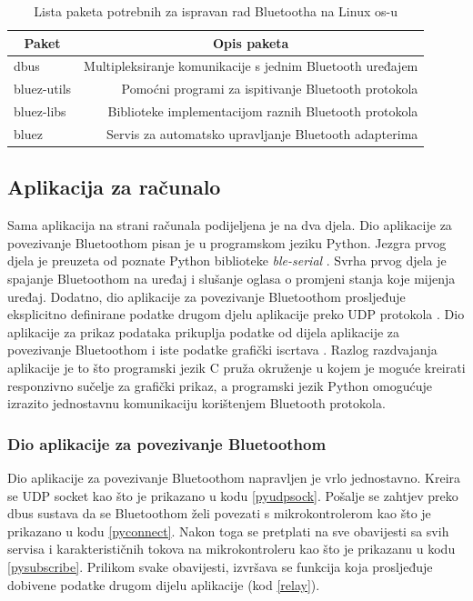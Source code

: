 \documentclass[times, utf8, diplomski]{diplomski}
\begin{document}
\begin{table}[H]
  \begin{center}
    \begin{tabular}[c]{l|r}
      \multicolumn{1}{c|}{\textbf{Paket}} & 
      \multicolumn{1}{c}{\textbf{Opis paketa}} \\
      \hline
      dbus & Multipleksiranje komunikacije s jednim Bluetooth uređajem \\
      bluez-utils & Pomoćni programi za ispitivanje Bluetooth protokola \\
      bluez-libs & Biblioteke implementacijom raznih Bluetooth protokola \\
      bluez & Servis za automatsko upravljanje Bluetooth adapterima \\
      \hline
    \end{tabular}
  \caption{Lista paketa potrebnih za ispravan rad Bluetootha na Linux os-u}
  \end{center}
\end{table}

\subsection{Aplikacija za računalo}
Sama aplikacija na strani računala podijeljena je na dva djela. Dio aplikacije za povezivanje Bluetoothom pisan je u programskom jeziku Python. Jezgra prvog djela je preuzeta od poznate Python biblioteke \textit{ble-serial} \cite{ble-serial}. Svrha prvog djela je spajanje Bluetoothom na uređaj i slušanje oglasa o promjeni stanja koje mijenja uređaj. Dodatno, dio aplikacije za povezivanje Bluetoothom prosljeđuje eksplicitno definirane podatke drugom djelu aplikacije preko UDP protokola \cite{firstPart}. Dio aplikacije za prikaz podataka prikuplja podatke od dijela aplikacije za povezivanje Bluetoothom i iste podatke grafički iscrtava \cite{secondPart}. Razlog razdvajanja aplikacije je to što programski jezik C pruža okruženje u kojem je moguće kreirati responzivno sučelje za grafički prikaz, a programski jezik Python omogućuje izrazito jednostavnu komunikaciju korištenjem Bluetooth protokola.

\subsubsection{Dio aplikacije za povezivanje Bluetoothom}
Dio aplikacije za povezivanje Bluetoothom napravljen je vrlo jednostavno. Kreira se UDP socket kao što je prikazano u kodu \ref{pyudpsock}. Pošalje se zahtjev preko dbus sustava da se Bluetoothom želi povezati s mikrokontrolerom kao što je prikazano u kodu \ref{pyconnect}. Nakon toga se pretplati na sve obavijesti sa svih servisa i karakterističnih tokova na mikrokontroleru kao što je prikazanu u kodu \ref{pysubscribe}. Prilikom svake obavijesti, izvršava se funkcija koja prosljeđuje dobivene podatke drugom dijelu aplikacije (kod \ref{relay}).
\end{document}
